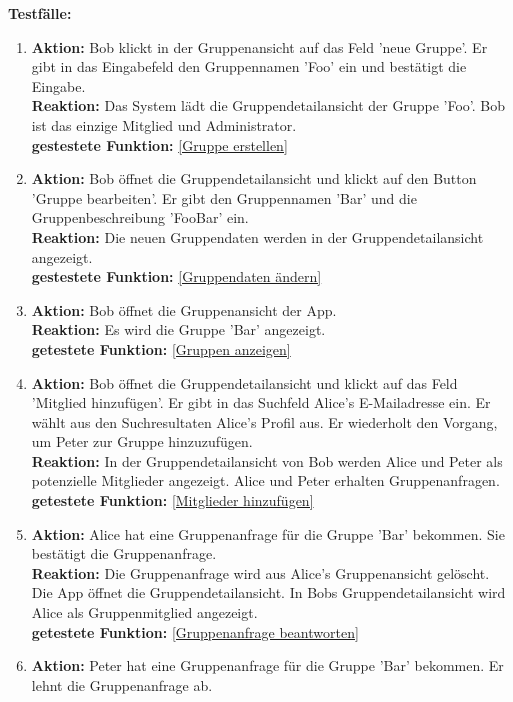 \documentclass[parskip=full]{scrartcl}
\def\threedigits#1{%
  \ifnum#1<100 0\fi
  \ifnum#1<10 0\fi
  \number#1}
\begin{document}
\textbf{Testfälle:}
\begin{enumerate}[label={\textbf{/T\protect\threedigits{\theenumi}0/}}, leftmargin=*, resume]
	\item \textbf{Aktion:} Bob klickt in der Gruppenansicht auf das Feld 'neue Gruppe'. Er gibt in das Eingabefeld den Gruppennamen 'Foo' ein und bestätigt die Eingabe.\\
	\textbf{Reaktion:} Das System lädt die Gruppendetailansicht der Gruppe 'Foo'. Bob ist das einzige Mitglied und Administrator.\\
	\textbf{gestestete Funktion:} \ref{Gruppe erstellen}
	\item \textbf{Aktion:} Bob öffnet die Gruppendetailansicht und klickt auf den Button 'Gruppe bearbeiten'. Er gibt den Gruppennamen 'Bar' und die Gruppenbeschreibung 'FooBar' ein.\\
	\textbf{Reaktion:} Die neuen Gruppendaten werden in der Gruppendetailansicht angezeigt.\\
	\textbf{gestestete Funktion:} \ref{Gruppendaten ändern}
	\item \textbf{Aktion:} Bob öffnet die Gruppenansicht der App.\\
	\textbf{Reaktion:} Es wird die Gruppe 'Bar' angezeigt.\\
	\textbf{getestete Funktion: }\ref{Gruppen anzeigen}
	\item \textbf{Aktion:} Bob öffnet die Gruppendetailansicht und klickt auf das Feld 'Mitglied hinzufügen'. Er gibt in das Suchfeld Alice's E-Mailadresse ein. Er wählt aus den Suchresultaten Alice's Profil aus. Er wiederholt den Vorgang, um Peter zur Gruppe hinzuzufügen.\\
	\textbf{Reaktion:} In der Gruppendetailansicht von Bob werden Alice und Peter als potenzielle Mitglieder angezeigt. Alice und Peter erhalten Gruppenanfragen.\\
	\textbf{getestete Funktion: }\ref{Mitglieder hinzufügen}
	\item \textbf{Aktion:} Alice hat eine Gruppenanfrage für die Gruppe 'Bar' bekommen. Sie bestätigt die Gruppenanfrage.\\
	\textbf{Reaktion:} Die Gruppenanfrage wird aus Alice's Gruppenansicht gelöscht. Die App öffnet die Gruppendetailansicht. In Bobs Gruppendetailansicht wird Alice als Gruppenmitglied angezeigt.\\
	\textbf{getestete Funktion:} \ref{Gruppenanfrage beantworten}
	\item \textbf{Aktion:} Peter hat eine Gruppenanfrage für die Gruppe 'Bar' bekommen. Er lehnt die Gruppenanfrage ab.\\

\end{enumerate}
\end{document}
